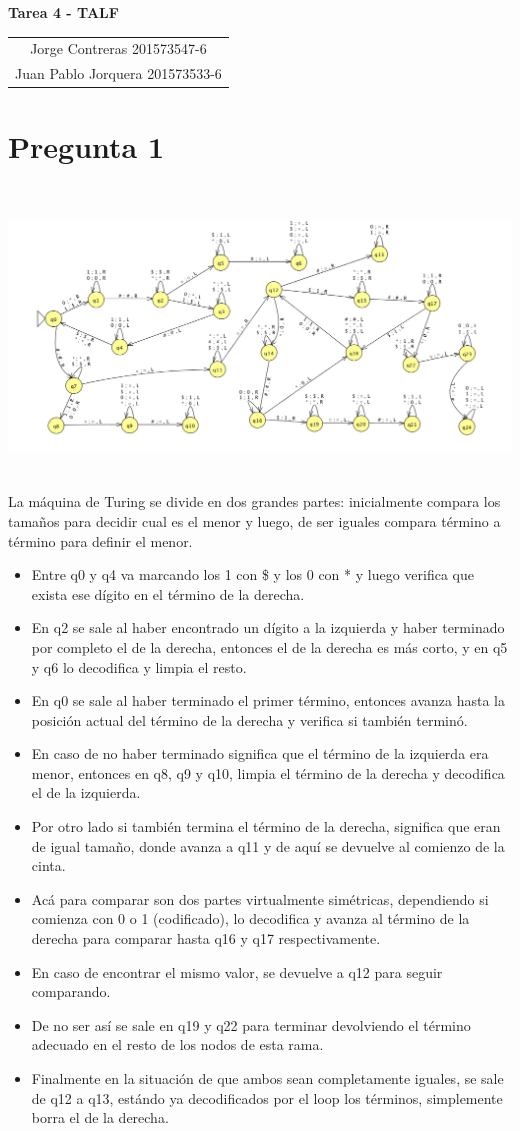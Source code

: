 \documentclass[11pt,letterpaper]{article}
\newcommand{\titulo}{Tarea 4 - TALF}
\newcommand{\integrantes}{\begin{tabular}{c}
Jorge Contreras 201573547-6 \\
Juan Pablo Jorquera  201573533-6 \\
\end{tabular}}
\renewcommand{\maketitle}
{
\thispagestyle{fancy}
\begin{center}
\begin{Large}
\textbf{\titulo}\\
\end{Large}
\vspace{0.5cm}
\integrantes
\end{center}
\vspace{0.3cm}
}
\begin{document}
\maketitle

\section{Pregunta 1}
\includegraphics[height=8cm]{p1.png}
La máquina de Turing se divide en dos grandes partes: inicialmente compara los tamaños para decidir cual es el menor y luego, de ser iguales compara término a término para definir el menor.
\begin{itemize}
	\item Entre q0 y q4 va marcando los 1 con \$ y los 0 con * y luego verifica que exista ese dígito en el término de la derecha.
	\item En q2 se sale al haber encontrado un dígito a la izquierda y haber terminado por completo el de la derecha, entonces el de la derecha es más corto, y en q5 y q6 lo decodifica y limpia el resto.
	\item En q0 se sale al haber terminado el primer término, entonces avanza hasta la posición actual del término de la derecha y verifica si también terminó.
	\item En caso de no haber terminado significa que el término de la izquierda era menor, entonces en q8, q9 y q10, limpia el término de la derecha y decodifica el de la izquierda.
	\item Por otro lado si también termina el término de la derecha, significa que eran de igual tamaño, donde avanza a q11 y de aquí se devuelve al comienzo de la cinta.
	\item Acá para comparar son dos partes virtualmente simétricas, dependiendo si comienza con 0 o 1 (codificado), lo decodifica y avanza al término de la derecha para comparar hasta q16 y q17 respectivamente.
	\item En caso de encontrar el mismo valor, se devuelve a q12 para seguir comparando.
	\item De no ser así se sale en q19 y q22 para terminar devolviendo el término adecuado en el resto de los nodos de esta rama.
	\item Finalmente en la situación de que ambos sean completamente iguales, se sale de q12 a q13, estándo ya decodificados por el loop los términos, simplemente borra el de la derecha.
\end{itemize}
\end{document}
